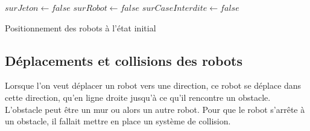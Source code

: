 \documentclass[a4paper, 12pt]{article}
\begin{document}
        \begin{algorithm}[H]%
            \DontPrintSemicolon
            $surJeton \gets false$
            $surRobot \gets false$
            $surCaseInterdite \gets false$
            \caption{\sc Positionnement des robots à l'état initial}
        \end{algorithm}%
        
    \subsection{Déplacements et collisions des robots}
    
        Lorsque l'on veut déplacer un robot vers une direction, ce robot se déplace dans cette direction, qu'en ligne droite jusqu'à ce qu'il rencontre un obstacle. L'obstacle peut être un mur ou alors un autre robot. Pour que le robot s'arrête à un obstacle, il fallait mettre en place un système de collision. 
        
\end{document}
